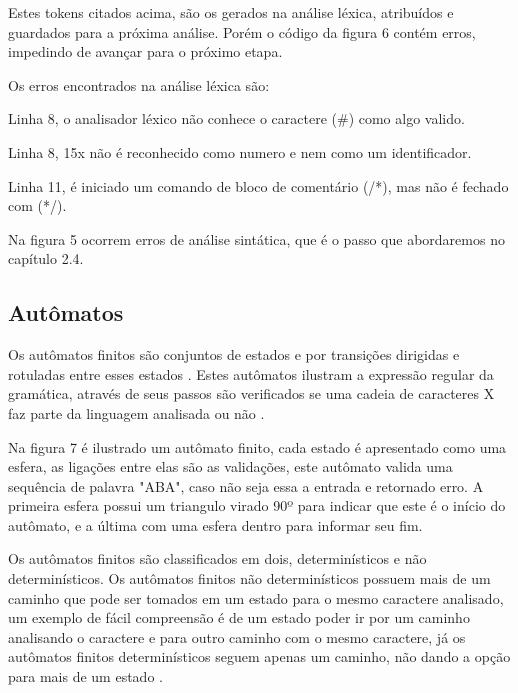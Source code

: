 \documentclass[12pt,oneside,a4paper,chapter=TITLE,section=TITLE,sumario=tradicional]{abntex2}
\begin{document}
Estes tokens citados acima, são os gerados na análise léxica, atribuídos e guardados para a próxima análise. Porém o código da figura 6 contém erros, impedindo de avançar para o próximo etapa.

Os erros encontrados na análise léxica são:

\begin{lista}
	\item Linha 8, o analisador léxico não conhece o caractere (\#) como algo valido.
	\item Linha 8, 15x não é reconhecido como numero e nem como um identificador.
	\item Linha 11, é iniciado um comando de bloco de comentário (/*), mas não é fechado com (*/).
\end{lista}

Na figura 5 ocorrem erros de análise sintática, que é o passo que abordaremos no capítulo 2.4.

\subsection{Autômatos}
\label{sec:automatos}

Os autômatos finitos são conjuntos de estados e por transições dirigidas e rotuladas entre esses estados \cite{pedro2018}. Estes autômatos ilustram a expressão regular da gramática, através de seus passos são verificados se uma cadeia de caracteres X faz parte da linguagem analisada ou não \cite{alfred1995}.

Na figura 7 é ilustrado um autômato finito, cada estado é apresentado como uma esfera, as ligações entre elas são as validações, este autômato valida uma sequência de palavra "ABA", caso não seja essa a entrada e retornado erro. A primeira esfera possui um triangulo virado 90º para indicar que este é o início do autômato, e a última com uma esfera dentro para informar seu fim.

\begin{figure}[htb]
\end{figure}

Os autômatos finitos são classificados em dois, determinísticos e não determinísticos. Os autômatos finitos não determinísticos possuem mais de um caminho que pode ser tomados em um estado para o mesmo caractere analisado, um exemplo de fácil compreensão é de um estado poder ir por um caminho analisando o caractere e para outro caminho com o mesmo caractere, já os autômatos finitos determinísticos seguem apenas um caminho, não dando a opção para mais de um estado \cite{alfred1995}.
\end{document}
